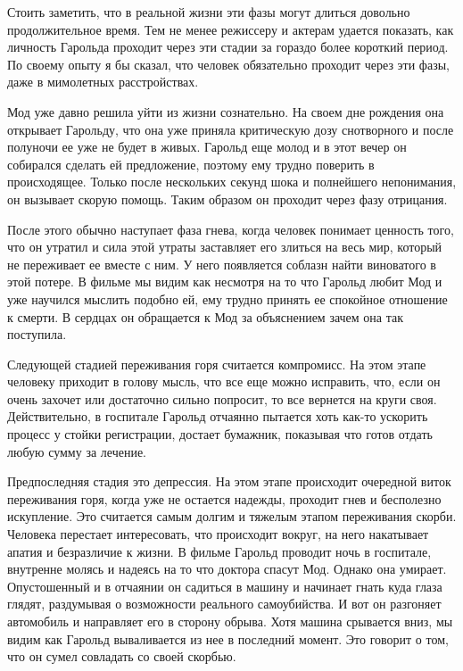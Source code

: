 \documentclass[a4paper,12pt]{report} %
\begin{document}
Стоить заметить, что в реальной жизни эти фазы могут длиться довольно продолжительное время. Тем не менее режиссеру и актерам удается показать, как личность Гарольда проходит через эти стадии за гораздо более короткий период.  По своему опыту я бы сказал, что человек обязательно проходит через эти фазы, даже в мимолетных расстройствах.

Мод уже давно решила уйти из жизни сознательно. На своем дне рождения она открывает Гарольду, что она уже приняла критическую дозу снотворного и после полуночи ее уже не будет в живых. Гарольд еще молод и в этот вечер он собирался сделать ей предложение, поэтому ему трудно поверить в происходящее. Только после нескольких секунд шока и полнейшего непонимания, он вызывает скорую помощь. Таким образом он проходит через фазу отрицания. 

После этого обычно наступает фаза гнева, когда человек понимает ценность того, что он утратил и сила этой утраты заставляет его злиться на весь мир, который не переживает ее вместе с ним. У него появляется соблазн найти виноватого в этой потере. В фильме мы видим как несмотря на то что Гарольд любит Мод и уже научился мыслить подобно ей, ему трудно принять ее спокойное отношение к смерти. В сердцах он обращается к Мод за объяснением зачем она так поступила. 

Следующей стадией переживания горя считается компромисс. На этом этапе человеку приходит в голову мысль, что все еще можно исправить, что, если он очень захочет или достаточно сильно попросит, то все вернется на круги своя. Действительно, в госпитале Гарольд отчаянно пытается хоть как-то ускорить процесс у стойки регистрации, достает бумажник, показывая что готов отдать любую сумму за лечение. 

Предпоследняя стадия это депрессия. На этом этапе происходит очередной виток переживания горя, когда уже не остается надежды, проходит гнев и бесполезно искупление. Это считается самым долгим и тяжелым этапом переживания скорби. Человека перестает интересовать, что происходит вокруг, на него накатывает апатия и безразличие к жизни. В фильме Гарольд проводит ночь в госпитале, внутренне молясь и надеясь на то что доктора спасут Мод. Однако она умирает. Опустошенный и в отчаянии он садиться в машину и начинает гнать куда глаза глядят, раздумывая о возможности реального самоубийства. И вот он разгоняет автомобиль и направляет его в сторону обрыва. Хотя машина срывается вниз, мы видим как Гарольд вываливается из нее в последний момент. Это говорит о том, что он сумел совладать со своей скорбью. 
\end{document}
